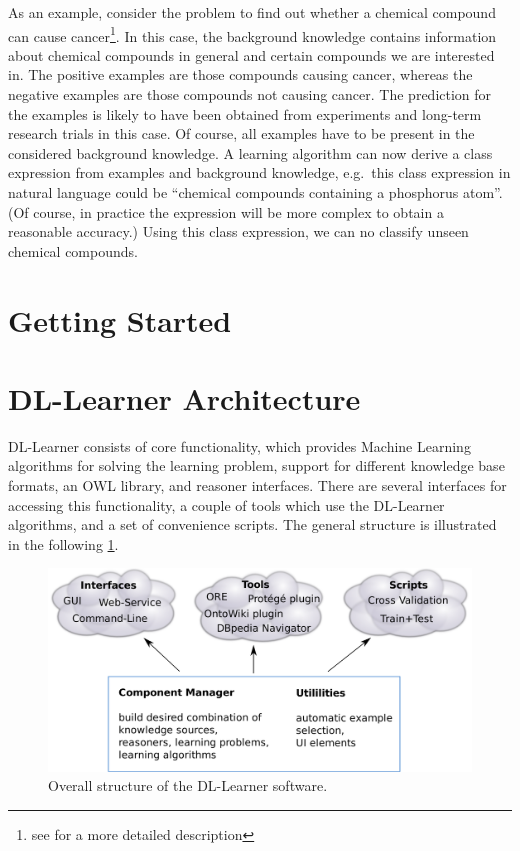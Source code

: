 \documentclass[a4paper,12pt]{scrartcl}
\begin{document}
As an example, consider the problem to find out whether a chemical compound can cause cancer\footnote{see \carc{} for a more detailed description}. In this case, the background knowledge contains information about chemical compounds in general and certain compounds we are interested in. The positive examples are those compounds causing cancer, whereas the negative examples are those compounds not causing cancer. The prediction for the examples is likely to have been obtained from experiments and long-term research trials in this case. Of course, all examples have to be present in the considered background knowledge. A learning algorithm can now derive a class expression from examples and background knowledge, e.g.~this class expression in natural language could be ``chemical compounds containing a phosphorus atom''. (Of course, in practice the expression will be more complex to obtain a reasonable accuracy.) Using this class expression, we can no classify unseen chemical compounds.

\section{Getting Started}

\section{DL-Learner Architecture}

DL-Learner consists of core functionality, which provides Machine Learning algorithms for solving the learning problem, support for different knowledge base formats, an OWL library, and reasoner interfaces. There are several interfaces for accessing this functionality, a couple of tools which use the DL-Learner algorithms, and a set of convenience scripts. The general structure is illustrated in the following \ref{fig:structure}.

\begin{figure}
 \includegraphics[width=\textwidth]{../../resources/structure_print}
 \caption{Overall structure of the DL-Learner software.}
 \label{fig:structure}
\end{figure}
\end{document}

